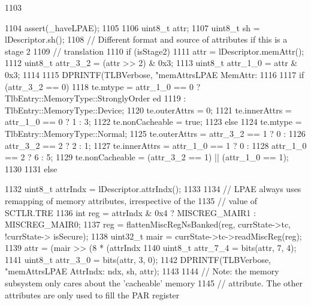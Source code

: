 \begin{DoxyCode}
1103 {
1104     assert(_haveLPAE);
1105 
1106     uint8_t attr;
1107     uint8_t sh = lDescriptor.sh();
1108     // Different format and source of attributes if this is a stage 2
1109     // translation
1110     if (isStage2) {
1111         attr = lDescriptor.memAttr();
1112         uint8_t attr_3_2 = (attr >> 2) & 0x3;
1113         uint8_t attr_1_0 =  attr       & 0x3;
1114 
1115         DPRINTF(TLBVerbose, "memAttrsLPAE MemAttr:%
1116 
1117         if (attr_3_2 == 0) {
1118             te.mtype        = attr_1_0 == 0 ? TlbEntry::MemoryType::StronglyOrder
      ed
1119                                             : TlbEntry::MemoryType::Device;
1120             te.outerAttrs   = 0;
1121             te.innerAttrs   = attr_1_0 == 0 ? 1 : 3;
1122             te.nonCacheable = true;
1123         } else {
1124             te.mtype        = TlbEntry::MemoryType::Normal;
1125             te.outerAttrs   = attr_3_2 == 1 ? 0 :
1126                               attr_3_2 == 2 ? 2 : 1;
1127             te.innerAttrs   = attr_1_0 == 1 ? 0 :
1128                               attr_1_0 == 2 ? 6 : 5;
1129             te.nonCacheable = (attr_3_2 == 1) || (attr_1_0 == 1);
1130         }
1131     } else {
1132         uint8_t attrIndx = lDescriptor.attrIndx();
1133 
1134         // LPAE always uses remapping of memory attributes, irrespective of the
1135         // value of SCTLR.TRE
1136         int reg = attrIndx & 0x4 ? MISCREG_MAIR1 : MISCREG_MAIR0;
1137         reg     = flattenMiscRegNsBanked(reg, currState->tc, !currState->
      isSecure);
1138         uint32_t mair = currState->tc->readMiscReg(reg);
1139         attr = (mair >> (8 * (attrIndx %
1140         uint8_t attr_7_4 = bits(attr, 7, 4);
1141         uint8_t attr_3_0 = bits(attr, 3, 0);
1142         DPRINTF(TLBVerbose, "memAttrsLPAE AttrIndx:%
      ndx, sh, attr);
1143 
1144         // Note: the memory subsystem only cares about the 'cacheable' memory
1145         // attribute. The other attributes are only used to fill the PAR register
      
}}
\end{DoxyCode}
